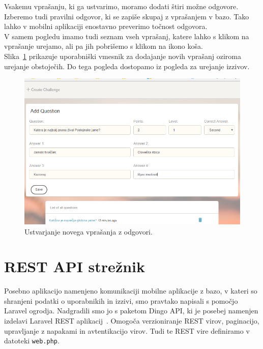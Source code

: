 \documentclass[a4paper, 12pt]{book}
\begin{document}
Vsakemu vprašanju, ki ga ustvarimo, moramo dodati štiri možne odgovore. Izberemo tudi pravilni odgovor, ki se zapiše skupaj z vprašanjem v bazo. Tako lahko v mobilni aplikaciji enostavno preverimo točnost odgovora.\\V samem pogledu imamo tudi seznam vseh vprašanj, katere lahko s klikom na vprašanje urejamo, ali pa jih pobrišemo s klikom na ikono koša.\\Slika~\ref{questions} prikazuje uporabniški vmesnik za dodajanje novih vprašanj oziroma urejanje obstoječih. Do tega pogleda dostopamo iz pogleda za urejanje izzivov.
\begin{figure}[H]
\centering
\includegraphics[height=0.66\textwidth]{slike/questions}
\caption{Ustvarjanje novega vprašanja z odgovori.}\label{questions}
\end{figure}

\section{REST API strežnik}
Posebno aplikacijo namenjeno komunikaciji mobilne aplikacije z bazo, v kateri so shranjeni podatki o uporabnikih in izzivi, smo pravtako napisali s pomočjo Laravel ogrodja. Nadgradili smo jo s paketom Dingo API, ki je posebej namenjen izdelavi Laravel REST aplikacij~\cite{Dingo}. Omogoča verzioniranje REST virov, paginacijo, upravljanje z napakami in avtentikacijo virov. Tudi te REST vire definiramo v datoteki \texttt{web.php}.
\end{document}
